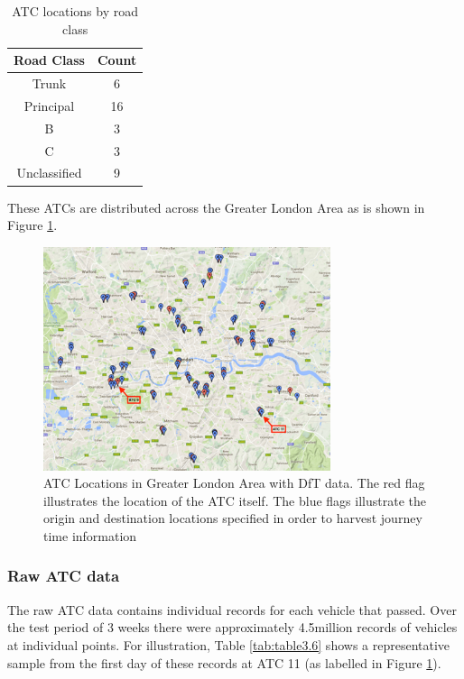 \documentclass{CUP-JNL-DCE}
\begin{document}
\begin{table}[h!]
	\centering
	\caption{ATC locations by road class}
	\label{tab:table3.5}
	\begin{tabular}{cc}
		\toprule
		Road Class & Count\\
		\midrule
		Trunk & 6\\
		Principal & 16\\
		B & 3\\
		C & 3\\
		Unclassified & 9\\
		\bottomrule
	\end{tabular}
\end{table}

These ATCs are distributed across the Greater London Area as is shown in Figure \ref{fig:Picture3.22}.

\begin{figure}[htbp!] 
	\centering    
	\includegraphics[width=0.75\textwidth]{Picture22}
	\caption[Map of ATC locations in the Greater London Area]{ATC Locations in Greater London Area \citep{google_maps} with DfT data. The red flag illustrates the location of the ATC itself. The blue flags illustrate the origin and destination locations specified in order to harvest journey time information}
	\label{fig:Picture3.22}
\end{figure}

\subsubsection{Raw ATC data}

The raw ATC data contains individual records for each vehicle that passed. Over the test period of 3 weeks there were approximately 4.5million records of vehicles at individual points. For illustration, Table \ref{tab:table3.6} shows a representative sample from the first day of these records at ATC 11 (as labelled in Figure \ref{fig:Picture3.22}). 
\end{document}
